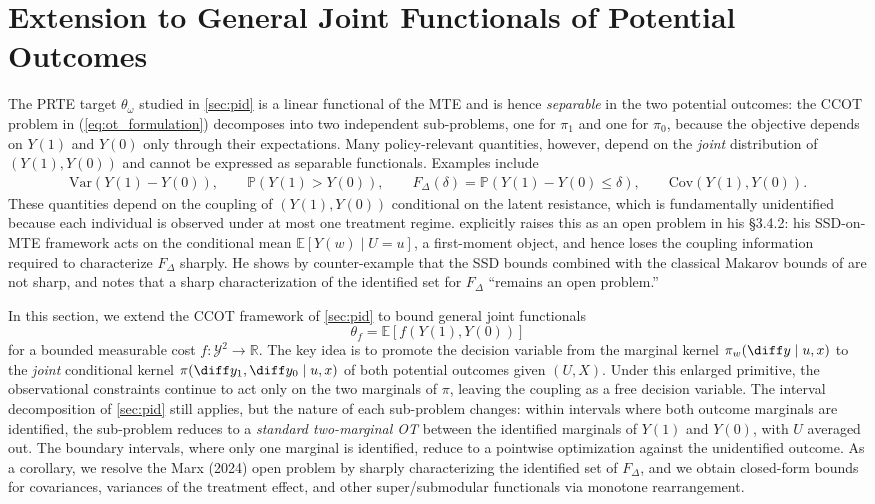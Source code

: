 \section{Extension to General Joint Functionals of Potential Outcomes}\label{sec:general_func}

The PRTE target $\theta_\omega$ studied in \cref{sec:pid} is a linear functional of the MTE and is hence \emph{separable} in the two potential outcomes: the CCOT problem in (\ref{eq:ot_formulation}) decomposes into two independent sub-problems, one for $\pi_1$ and one for $\pi_0$, because the objective depends on $Y(1)$ and $Y(0)$ only through their expectations. Many policy-relevant quantities, however, depend on the \emph{joint} distribution of $(Y(1), Y(0))$ and cannot be expressed as separable functionals. Examples include
\begin{align*}
    \mathrm{Var}(Y(1) - Y(0)), \qquad \mathbb{P}(Y(1) > Y(0)), \qquad F_{\Delta}(\delta) = \mathbb{P}(Y(1) - Y(0) \leqslant \delta),\qquad \mathrm{Cov}(Y(1), Y(0)).
\end{align*}
These quantities depend on the coupling of $(Y(1), Y(0))$ conditional on the latent resistance, which is fundamentally unidentified because each individual is observed under at most one treatment regime. \citet{marx2024sharp} explicitly raises this as an open problem in his \S 3.4.2: his SSD-on-MTE framework acts on the conditional mean $\mathbb{E}[Y(w) \mid U = u]$, a first-moment object, and hence loses the coupling information required to characterize $F_\Delta$ sharply. He shows by counter-example that the SSD bounds combined with the classical Makarov bounds of \citet{fan_park2010sharp} are not sharp, and notes that a sharp characterization of the identified set for $F_\Delta$ ``remains an open problem.''

In this section, we extend the CCOT framework of \cref{sec:pid} to bound general joint functionals
\begin{equation}\label{eq:gf_target}
    \theta_f = \mathbb{E}[f(Y(1), Y(0))]
\end{equation}
for a bounded measurable cost $f: \mathcal{Y}^2 \to \mathbb{R}$. The key idea is to promote the decision variable from the marginal kernel $\pi_w(\diff y \mid u, x)$ to the \emph{joint} conditional kernel $\pi(\diff y_1, \diff y_0 \mid u, x)$ of both potential outcomes given $(U, X)$. Under this enlarged primitive, the observational constraints continue to act only on the two marginals of $\pi$, leaving the coupling as a free decision variable. The interval decomposition of \cref{sec:pid} still applies, but the nature of each sub-problem changes: within intervals where both outcome marginals are identified, the sub-problem reduces to a \emph{standard two-marginal OT} between the identified marginals of $Y(1)$ and $Y(0)$, with $U$ averaged out. The boundary intervals, where only one marginal is identified, reduce to a pointwise optimization against the unidentified outcome. As a corollary, we resolve the Marx (2024) open problem by sharply characterizing the identified set of $F_\Delta$, and we obtain closed-form bounds for covariances, variances of the treatment effect, and other super/submodular functionals via monotone rearrangement.


